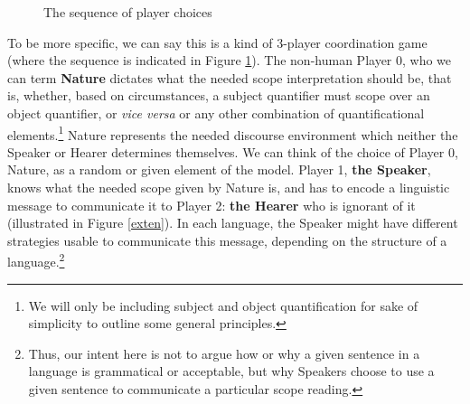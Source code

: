 \documentclass{article}
\begin{document}
\begin{figure}
\begin{center}
\end{center}
	\caption{The sequence of player choices\label{seq}}
\end{figure}

To be more specific, we can say this is a kind of 3-player coordination game (where the sequence is indicated in Figure \ref{seq}).
The non-human Player 0, who we can term \textbf{Nature} dictates what the needed scope interpretation should be, that is, whether, based on circumstances, a subject quantifier must scope over an object quantifier, or \emph{vice versa} or any other combination of quantificational elements.\footnote{We will only be including subject and object quantification for sake of simplicity to outline some general principles.}
Nature represents the needed discourse environment which neither the Speaker or Hearer determines themselves.
We can think of the choice of Player 0, Nature, as a random or given element of the model.
Player 1, \textbf{the Speaker}, knows what the needed scope given by Nature is, and has to encode a linguistic message to communicate it to Player 2: \textbf{the Hearer} who is ignorant of it (illustrated in Figure \ref{exten}).
In each language, the Speaker might have different strategies usable to communicate this message, depending on the structure of a language.\footnote{Thus, our intent here is not to argue how or why a given sentence in a language is grammatical or acceptable, but why Speakers choose to use a given sentence to communicate a particular scope reading.}
\end{document}
